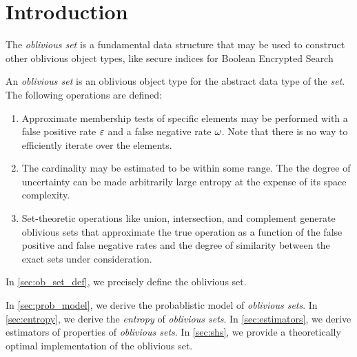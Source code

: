 \documentclass[ ../main.tex]{subfiles}
\begin{document}
\section{Introduction}
The \emph{oblivious set}\cite{oset} is a fundamental data structure that may be used to construct other oblivious object types, like secure indices for Boolean Encrypted Search\cite{sibool}

An \emph{oblivious set} is an oblivious object type for the abstract data type of the \emph{set}. The following operations are defined:
\begin{enumerate}
    \item Approximate membership tests of specific elements may be performed with a false positive rate $\varepsilon$ and a false negative rate $\omega$. Note that there is no way to efficiently iterate over the elements.
    
    \item The cardinality may be estimated to be within some range. The the degree of uncertainty can be made arbitrarily large entropy at the expense of its space complexity.
        
    \item Set-theoretic operations like union, intersection, and complement generate oblivious sets that approximate the true operation as a function of the false positive and false negative rates and the degree of similarity between the exact sets under consideration.
\end{enumerate}

In \cref{sec:ob_set_def}, we precisely define the oblivious set.


In \cref{sec:prob_model}, we derive the probablistic model of \emph{oblivious sets}. In \cref{sec:entropy}, we derive the \emph{entropy} of \emph{oblivious sets}. In \cref{sec:estimators}, we derive estimators of properties of \emph{oblivious sets}. In \cref{sec:shs}, we provide a theoretically optimal implementation of the oblivious set.
\end{document}
